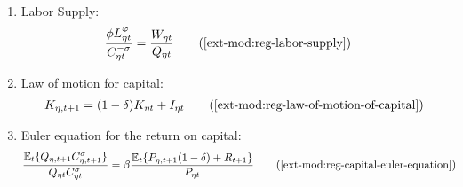 \documentclass[../thesis.tex]{subfiles}
\begin{document}
{\begin{itemize}
\begin{enumerate}
\begin{comment}
		\begin{align}
			\frac{Q_{1t}}{Q_{2t}} &= \frac{\omega_{21}^{\omega_{21}} (1 -\omega_{21})^{1 -\omega_{21}}}{\omega_{11}^{\omega_{11}} (1 - \omega_{11})^{1 - \omega_{11}}} \tag{\ref{ext-mod:reg-total-expense-level-2}}
		\end{align}
	
\end{comment}
		
		\item Labor Supply:
			\begin{align}
				\frac{\phi L_{\eta t}^{\varphi}}{C_{\eta t}^{-\sigma}} &= \frac{W_{\eta t}}{Q_{\eta t}} \tag{\ref{ext-mod:reg-labor-supply}}
			\end{align}
		
		\item Law of motion for capital:
		\begin{align}
			K_{\eta,t+1} = (1 - \delta) K_{\eta t} + I_{\eta t} \tag{\ref{ext-mod:reg-law-of-motion-of-capital}}
		\end{align}		

		\item Euler equation for the return on capital:
		\begin{align}
			\frac{\mathbb{E}_{t} \{ Q_{\eta,t+1} C_{\eta,t+1}^{\sigma} \} }{ Q_{\eta t} C_{\eta t}^{\sigma} } &= \beta \frac{ \mathbb{E}_{t} \{ P_{\eta,t+1} (1 - \delta) + R_{t+1} \} }{P_{\eta t}} \tag{\ref{ext-mod:reg-capital-euler-equation}}
		\end{align}

		\begin{comment}

			\item Region 1 Euler equation for the bonds return:
			\begin{align}
				\frac{\mathbb{E}_{t} \left\{Q_{1, t+1} C_{1, t+1}^{\sigma} \right\}}{Q_{1t} C_{1t}^{\sigma}} &= \beta (1 + R_{t}) \tag{\ref{ext-mod:reg-capital-euler-equation}}
			\end{align}
			
			\item Euler equation for regional consumption:
			\begin{align}
				\frac{\mathbb{E}_{t} \left\{ Q_{1, t+1} C_{1, t+1}^{\sigma} \right\}}{Q_{1t} C_{1t}^{\sigma}} &= \frac{\mathbb{E}_{t} \left\{ Q_{2, t+1} C_{2, t+1}^{\sigma} \right\}}{Q_{2t} C_{2t}^{\sigma}} \tag{\ref{ext-mod:reg-bonds-euler-equation-2}}
			\end{align}
			

\end{comment}
\end{enumerate}
\end{itemize}}
\end{document}
